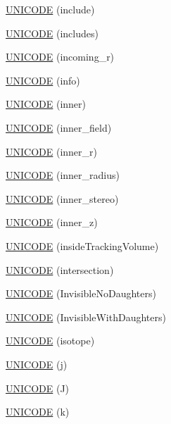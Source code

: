 \begin{DoxyCompactItemize}
\item 
\hyperlink{namespace_d_d4hep_1_1_x_m_l_a7eb13b46fe76d221055f8b22c04d62b0}{UNICODE} (include)
\item 
\hyperlink{namespace_d_d4hep_1_1_x_m_l_a16348e2302a113086ac0368d41ce7de7}{UNICODE} (includes)
\item 
\hyperlink{namespace_d_d4hep_1_1_x_m_l_a7f9a4abb0ea78ba6c906b4e01ab20f96}{UNICODE} (incoming\_\-r)
\item 
\hyperlink{namespace_d_d4hep_1_1_x_m_l_a121d723b2df3a5154cae8f29fcbdef18}{UNICODE} (info)
\item 
\hyperlink{namespace_d_d4hep_1_1_x_m_l_a493fc42470b4fe63c1af04c9dc58823c}{UNICODE} (inner)
\item 
\hyperlink{namespace_d_d4hep_1_1_x_m_l_a03f277eadaca1de64988b99a7c69560a}{UNICODE} (inner\_\-field)
\item 
\hyperlink{namespace_d_d4hep_1_1_x_m_l_a8d82a8a4d288d870a5fa27fd3190182c}{UNICODE} (inner\_\-r)
\item 
\hyperlink{namespace_d_d4hep_1_1_x_m_l_af8394dd5806960d0d54c04be776dff7d}{UNICODE} (inner\_\-radius)
\item 
\hyperlink{namespace_d_d4hep_1_1_x_m_l_a39bafd71ec3133cc21736abf2e9d631a}{UNICODE} (inner\_\-stereo)
\item 
\hyperlink{namespace_d_d4hep_1_1_x_m_l_aaa87719f357bec899257b32769f86ab9}{UNICODE} (inner\_\-z)
\item 
\hyperlink{namespace_d_d4hep_1_1_x_m_l_a3ae595669e40f727e23c89d11612b7a5}{UNICODE} (insideTrackingVolume)
\item 
\hyperlink{namespace_d_d4hep_1_1_x_m_l_a597e217c746431268c6b96122c13fc75}{UNICODE} (intersection)
\item 
\hyperlink{namespace_d_d4hep_1_1_x_m_l_abc8efddf185faa2be9c966015e442261}{UNICODE} (InvisibleNoDaughters)
\item 
\hyperlink{namespace_d_d4hep_1_1_x_m_l_a9e9ef0fa1a9d0ff3b077169b722887fd}{UNICODE} (InvisibleWithDaughters)
\item 
\hyperlink{namespace_d_d4hep_1_1_x_m_l_a56f93391cd06d15047599fd53541e8e7}{UNICODE} (isotope)
\item 
\hyperlink{namespace_d_d4hep_1_1_x_m_l_a361a5dd420db207570ade65425be05e2}{UNICODE} (j)
\item 
\hyperlink{namespace_d_d4hep_1_1_x_m_l_af88b951d5a98494ffe19ce7f80cc9a15}{UNICODE} (J)
\item 
\hyperlink{namespace_d_d4hep_1_1_x_m_l_af9def7d272fa859eabb301c870d2bb32}{UNICODE} (k)
\item 

\end{DoxyCompactItemize}
